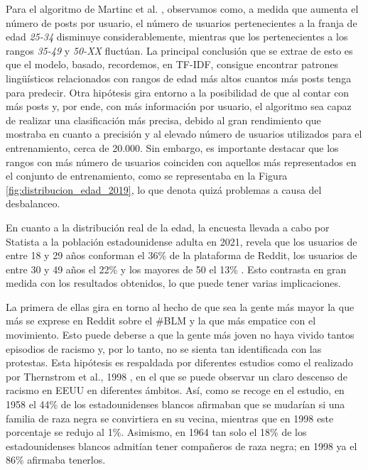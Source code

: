 \bigskip
Para el algoritmo de Martinc et al. \cite{martinc2019hot}, observamos
como, a medida que aumenta el número de posts por usuario, el número de usuarios pertenecientes a la franja de edad \textit{25-34} disminuye
considerablemente, mientras que los pertenecientes a los rangos \textit{35-49} y \textit{50-XX} fluctúan.
La principal conclusión que se extrae de esto es que el modelo, basado, recordemos, en TF-IDF, consigue encontrar patrones lingüísticos
relacionados con rangos de edad más altos cuantos más posts tenga para predecir.
Otra hipótesis gira entorno a la posibilidad de que al contar con más posts y, por ende, con más información por usuario,
el algoritmo sea capaz de realizar una clasificación más precisa, debido al gran rendimiento que mostraba en cuanto
a precisión y al elevado número de usuarios utilizados para el entrenamiento, cerca de 20.000.
Sin embargo, es importante destacar que los rangos con más número de usuarios coinciden con aquellos
más representados en el conjunto de entrenamiento, como se representaba en la Figura \ref{fig:distribucion_edad_2019}, lo que denota quizá problemas
a causa del desbalanceo.

\bigskip
En cuanto a la distribución real de la edad, la encuesta llevada a cabo por Statista a la población estadounidense adulta en 2021,
revela que los usuarios de entre 18 y 29 años conforman el 36\% de la plataforma de Reddit, los usuarios de entre 30 y 49 años el 22\% y los mayores de 50 el 13\% \cite{statistaedad}.
Esto contrasta en gran medida con los resultados obtenidos, lo que puede tener varias implicaciones.

\bigskip
La primera de ellas gira en torno
al hecho de que sea la gente más mayor la que más se exprese en Reddit sobre el \#BLM y la que más empatice con el movimiento. Esto
puede deberse a que la gente más joven no haya vivido tantos episodios de racismo y, por lo tanto, no se sienta tan identificada con las protestas.
Esta hipótesis es respaldada por diferentes estudios como el realizado por Thernstrom et al., 1998 \cite{thernstrom1998black}, en el que se puede observar un claro descenso de
racismo en EEUU en diferentes ámbitos. Así, como se recoge en el estudio, en 1958 el 44\% de los estadounidenses blancos afirmaban que se mudarían si
una familia de raza negra se convirtiera en su vecina, mientras que en 1998 este porcentaje se redujo al 1\%. Asimismo, en 1964 tan solo el 18\% de los estadounidenses blancos
admitían tener compañeros de raza negra; en 1998 ya el 86\% afirmaba tenerlos.


